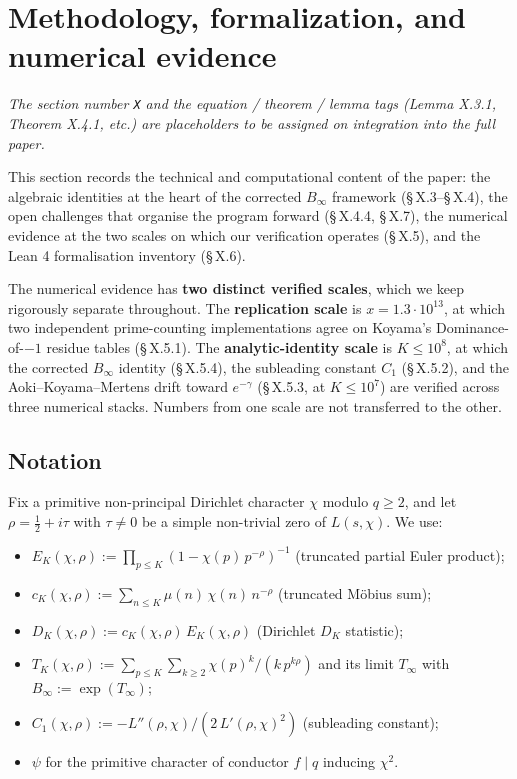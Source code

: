 \section{Methodology, formalization, and numerical evidence}

\emph{The section number \texttt{X} and the equation / theorem / lemma tags
(Lemma X.3.1, Theorem X.4.1, etc.) are placeholders to be assigned
on integration into the full paper.}

This section records the technical and computational content of the
paper: the algebraic identities at the heart of the corrected
\(B_\infty\) framework (\S\,X.3--\S\,X.4), the open challenges that organise
the program forward (\S\,X.4.4, \S\,X.7), the numerical evidence at the
two scales on which our verification operates (\S\,X.5), and the Lean 4
formalisation inventory (\S\,X.6).

The numerical evidence has \textbf{two distinct verified scales}, which
we keep rigorously separate throughout. The \textbf{replication scale}
is \(x = 1.3 \cdot 10^{13}\), at which two independent prime-counting
implementations agree on Koyama's Dominance-of-\(-1\) residue tables
(\S\,X.5.1). The \textbf{analytic-identity scale} is \(K \le 10^{8}\), at
which the corrected \(B_\infty\) identity (\S\,X.5.4), the subleading
constant \(C_1\) (\S\,X.5.2), and the Aoki--Koyama--Mertens drift toward
\(e^{-\gamma}\) (\S\,X.5.3, at \(K \le 10^{7}\)) are verified across
three numerical stacks. Numbers
from one scale are not transferred to the other.

\subsection{Notation}

Fix a primitive non-principal Dirichlet character \(\chi\) modulo
\(q \ge 2\), and let \(\rho = \tfrac12 + i\tau\) with \(\tau \neq 0\) be a
simple non-trivial zero of \(L(s,\chi)\). We use:

\begin{itemize}
\item
  \(E_K(\chi,\rho) := \prod_{p \le K} (1 - \chi(p)\,p^{-\rho})^{-1}\)
  (truncated partial Euler product);
\item
  \(c_K(\chi,\rho) := \sum_{n \le K} \mu(n)\,\chi(n)\,n^{-\rho}\)
  (truncated Möbius sum);
\item
  \(D_K(\chi,\rho) := c_K(\chi,\rho)\,E_K(\chi,\rho)\)
  (Dirichlet \(D_K\) statistic);
\item
  \(T_K(\chi,\rho) := \sum_{p \le K}\sum_{k \ge 2} \chi(p)^k / (k\,p^{k\rho})\)
  and its limit \(T_\infty\) with \(B_\infty := \exp(T_\infty)\);
\item
  \(C_1(\chi,\rho) := -L''(\rho,\chi) / (2\,L'(\rho,\chi)^2)\)
  (subleading constant);
\item
  \(\psi\) for the primitive character of conductor \(f \mid q\) inducing
  \(\chi^2\).
\end{itemize}

